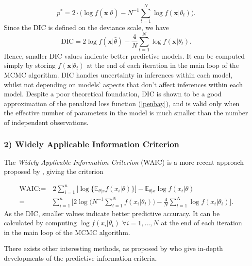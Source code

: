 \begin{equation*}
p^*=2\cdot \bigg(\log f(\boldsymbol{x}|\bar{\theta})-N^{-1}\sum_{t=1}^N\log f(\boldsymbol{x}|\theta_t)\bigg).
\end{equation*}
Since the DIC is defined on the deviance scale, we have
\begin{equation}
\text{DIC}= 2\log f(\boldsymbol{x}|\bar{\theta}) - \frac{4}{N} \sum_{t=1}^N\log f(\boldsymbol{x}|\theta_t).
\end{equation}
Hence, smaller DIC values indicate better predictive models. It can be computed simply by storing $f(\boldsymbol{x}|\theta_t) $ at the end of each iteration in the main loop of the MCMC algorithm. DIC
handles uncertainty in inferences within each model, whilst not depending on models' aspects that don’t affect inferences within each model. Despite a poor theoretical foundation, DIC is shown to be a good approximation of the penalized loss function (\ref{penbay}), and is valid only when the effective number of parameters in the model is much smaller than the number of independent observations.


\subsubsection*{2) Widely Applicable Information Criterion}

The \emph{Widely Applicable Information Criterion} (WAIC) is a more recent approach proposed by \citet{Watanabe_asymptotic_2010}, giving the criterion  


\begin{equation}
\begin{aligned}
\text{WAIC}:= & \ 2 \sum_{i=1}^n\Big[\log\big\{\mathbb{E}_{\theta|x}f(x_i|\theta)\big\}\Big]- \mathbb{E}_{\theta|x}\log f(x_i|\theta) \\
= &\sum_{i=1}^n\Bigg[2\log \bigg(N^{-1}\sum_{t=1}^N f(x_i|\theta_t)\bigg)-\frac{4}{N}\sum_{t=1}^N\log f(x_i|\theta_t)\Bigg].
\end{aligned}
\end{equation}
As the DIC, smaller values indicate better predictive accuracy. It can be calculated by computing $\log f(x_i|\theta_t)$ $\forall i=1,\ldots,N$ at the end of each iteration in the main loop of the MCMC algorithm.

There exists other interesting methods, as proposed by \citet{gelman_understanding_2014} who give in-depth developments of the predictive information criteria.

 




